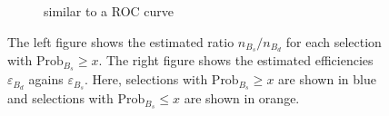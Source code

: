 \begin{figure}
\begin{subfigure}{0.5\textwidth}
        \caption{similar to a ROC curve}
        \label{fig:data_roc}
    \end{subfigure}%
    \caption{The left figure shows the estimated ratio $n_{B_s}/n_{B_d}$ for each selection with $\text{Prob}_{B_s} \geq x$. The right figure shows the estimated efficiencies $\varepsilon_{B_d}$ agains $\varepsilon_{B_s}$. Here, selections with $\text{Prob}_{B_s} \geq x$ are shown in blue and selections with $\text{Prob}_{B_s} \leq x$ are shown in orange.}
\end{figure}


